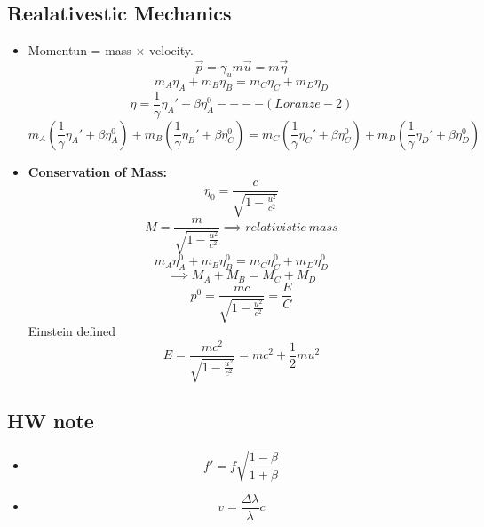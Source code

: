 \documentclass[fleqn,a4paper,12pt]{article}
\begin{document}
\begin{itemize}
\begin{itemize}
          
        
    \end{itemize}
    
\subsection{Realativestic Mechanics}
\begin{itemize}
\item
  Momentun = mass $\times$ velocity.
  \[ \overrightarrow{p} = \gamma_u m \overrightarrow{u} = m \overrightarrow{\eta} \]
  \[ m_A \eta_A + m_B \eta_B = m_C \eta_C + m_D \eta_D \]
  \[ \eta = \frac{1}{\gamma} \eta_A' + \beta \eta_A^0  ----(Loranze-2) \]
  \[ m_A( \frac{1}{\gamma} \eta_A' + \beta \eta_A^0 ) + m_B ( \frac{1}{\gamma} \eta_B' + \beta \eta_C^0 ) = m_C ( \frac{1}{\gamma} \eta_C' + \beta \eta_C^0 ) + m_D ( \frac{1}{\gamma} \eta_D' + \beta \eta_D^0 )  \]
\item \textbf{Conservation of Mass:}\\
  \[ \eta_0 = \frac{c}{ \sqrt{ 1 - \frac{u^2}{c^2} } } \]
  \[ M = \frac{m}{ \sqrt{ 1 - \frac{u^2}{c^2} } } \implies relativistic\ mass \]
  \[ m_A\eta_A^0 + m_B\eta_B^0 = m_C\eta_C^0 + m_D\eta_D^0 \]  
  \[ \implies M_A + M_B = M_C + M_D \]
  \[ p^0 = \frac{ mc }{ \sqrt{ 1 - \frac{u^2}{c^2} } } = \frac{ E }{ C } \]
  Einstein defined
  \[E = \frac{ mc^2 }{ \sqrt{ 1 - \frac{u^2}{c^2} } }  = mc^2 + \frac{1}{2} m u^2 \]
\end{itemize}


\end{itemize}

\subsection{HW note}
\begin{itemize}
  \item
    \[  f' = f \sqrt{ \frac{ 1 - \beta }{ 1 + \beta } } \]
  \item
    \[ v = \frac {\Delta \lambda }{ \lambda } c\]
    

\end{itemize}
\end{document}
